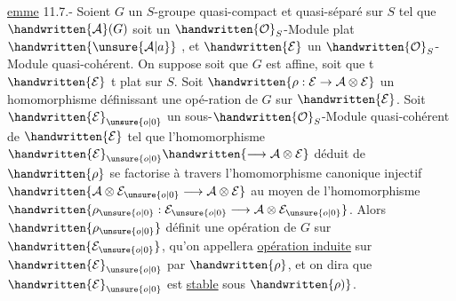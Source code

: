 \uline{emme} 11.7.- Soient $G$ un $S$-groupe quasi-compact et quasi-séparé sur $S$\handwritten{,} tel que $\handwritten{\mathcal{A}}(G)$ soit
un $\handwritten{\mathcal{O}}_S$-Module plat $\handwritten{\unsure{\mathcal{A}|a}}$ , et $\handwritten{\mathcal{E}}$ un $\handwritten{\mathcal{O}}_S$-Module quasi-cohérent. On suppose soit que $G$ est affine, soit que t $\handwritten{\mathcal{E}}$ t plat sur $S$. Soit $\handwritten{\rho:\mathcal{E}\to\mathcal{A}\otimes\mathcal{E}}$ un homomorphisme définissant une opé-\linebreak ration de $G$ sur $\handwritten{\mathcal{E}}$. Soit $\handwritten{\mathcal{E}}_{\unsure{o|0}}$ un sous-$\handwritten{\mathcal{O}}_S$-Module quasi-cohérent de $\handwritten{\mathcal{E}}$ tel que l'homomorphisme $\handwritten{\mathcal{E}}_{\unsure{o|0}}\handwritten{\longrightarrow\mathcal{A}\otimes\mathcal{E}}$ déduit de $\handwritten{\rho}$ se factorise à travers l'homomorphisme canonique \handwritten{(}injectif $\handwritten{\mathcal{A}\otimes\mathcal{E}_{\unsure{o|0}}\longrightarrow\mathcal{A}\otimes\mathcal{E}}$ au moyen de l'homomorphisme $\handwritten{\rho_{\unsure{o|0}}:\mathcal{E}_{\unsure{o|0}}\longrightarrow\mathcal{A}\otimes\mathcal{E}_{\unsure{o|0}}}$. Alors $\handwritten{\rho_{\unsure{o|0}}}$ définit une opération de $G$ sur $\handwritten{\mathcal{E}_{\unsure{o|0}}}$\handwritten{(},\handwritten{(} qu'on appellera \uline{opération induite} sur $\handwritten{\mathcal{E}}_{\unsure{o|0}}$ par $\handwritten{\rho}$, et on dira que $\handwritten{\mathcal{E}}_{\unsure{o|0}}$ est \uline{stable} sous $\handwritten{\rho)}$.

